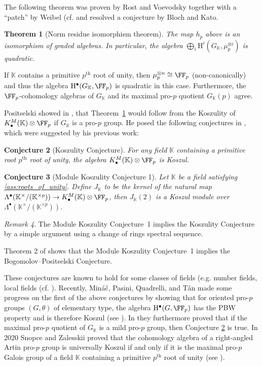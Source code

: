 \documentclass{amsart}
\newtheorem{thm}{Theorem}[section]
\newtheorem{conj}[thm]{Conjecture}
\theoremstyle{definition}
\theoremstyle{remark}
\newtheorem{rem}[thm]{Remark}
\newcommand{\rmH}{\mathrm{H}}
\numberwithin{equation}{section}
\begin{document}
The following theorem was proven by Rost and Voevodsky together with a 
``patch'' by Weibel (cf. \cites{Voevodsky2011,Weibel2008,Weibel2009} and resolved a conjecture by Bloch and Kato.
\begin{thm}[Norm residue isomorphism theorem]
\label{thm:BlochKato}
    The map $h_p$ above is an isomorphism of graded algebras. In particular, the algebra $\bigoplus_{i}\rmH^i(G_\mathbb{K},\mu_p^{\otimes i})$ is quadratic.
\end{thm}
If $\mathbb{K}$ contains a primitive $p^{\text{th}}$ root of unity, then $\mu_p^{\otimes n}\cong \FF_p$ (non-canonically) and thus the algebra $\rmH^\bullet(G_\mathbb{K},\FF_p)$ is quadratic in this case. Furthermore, the $\FF_p$-cohomology algebras of $G_\mathbb{K}$ and its maximal pro-$p$ quotient $G_\mathbb{K}(p)$ agree.

Positselski showed in \cite{PositselskiVishik1995}, that Theorem~\ref{thm:BlochKato} would follow from the Koszulity of $K^M_\bullet(\mathbb{K})\otimes \FF_p$ if $G_\mathbb{K}$ is a pro-$p$ group. He posed the following conjectures in \cite{Positselski2014}, which were suggested by his previous work:
\begin{conj}[Koszulity Conjecture]
\label{conj:KoszulityConjecture}
    For any field $\mathbb{K}$ containing a primitive root $p^{\text{th}}$ root of unity, the algebra $K^M_\bullet(\mathbb{K})\otimes \FF_p$ is Koszul.
\end{conj}
\begin{conj}[Module Koszulity Conjecture 1]
\label{conj:ModuleKoszulityConjecture1}
    Let $\mathbb{K}$ be a field satisfying \ref{ass:roots_of_unity}. Define  $J_\mathbb{K}$ to be the kernel of the natural map $ \Lambda^\bullet(\mathbb{K}^\times/(\mathbb{K}^{\times p}))\to K^M_\bullet(\mathbb{K})\otimes \FF_p$, then $J_\mathbb{K}(2)$ is a Koszul module over $\Lambda^\bullet(\mathbb{K}^\times/(\mathbb{K}^{\times p}))$.
\end{conj}
\begin{rem}
    The Module Koszulity Conjecture~1 implies the Koszulity Conjecture by a simple argument using a change of rings spectral sequence.
    
    Theorem 2 of \cite{Positselski2005} shows that the Module Koszulity Conjecture~1 implies the Bogomolov--Positselski Conjecture. 
\end{rem}
These conjectures are known to hold for some classes of fields (e.g. number fields, local fields (cf. \cite{Positselski2014}). Recently, Miná{\^c}, Pasini, Quadrelli, and Tân made some progress on the first of the above conjectures by showing that for oriented pro-$p$ groups $(G,\theta)$ of elementary type, the algebra $\rmH^\bullet(G,\FF_p)$ has the PBW property and is therefore Koszul (see \cite{MinacPasiniQuadrelliTan2022}). In \cite{MinacPasiniQuadrelliTan2021} they furthermore proved that if the maximal pro-$p$ quotient of $G_\mathbb{K}$ is a mild pro-$p$ group, then Conjecture \ref{conj:KoszulityConjecture} is true. In 2020 Snopce and Zalesskii proved that the cohomology algebra of a right-angled Artin pro-$p$ group is universally Koszul if and only if it is the maximal pro-$p$ Galois group of a field $\mathbb{K}$ containing a primitive $p^{\text{th}}$ root of unity (see \cite{SnopceZalesskii2022}).
\end{document}
